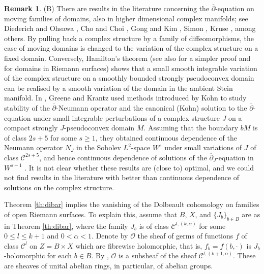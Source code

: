 \documentclass[11pt]{amsart}
\numberwithin{equation}{section}
\theoremstyle{definition}
\newtheorem{remark}[theorem]{Remark}
\newcommand\Cscr{\mathscr{C}}
\newcommand\Oscr{\mathscr{O}}
\newcommand\dibar{\overline\partial}
\begin{document}
\begin{remark}
\noindent 
(B) There are results in the literature concerning the $\dibar$-equation 
on moving families of domains, also in higher dimensional complex manifolds; 
see Diederich and Ohsawa \cite{DiederichOhsawa1991}, 
Cho and Choi \cite{ChoChoi2008}, 
Gong and Kim \cite[Theorem 4.5]{GongKim2018},
Simon \cite{Simon2019JGA}, 
Kruse \cite{Kruse2020}, 
among others. By pulling back a complex structure by a
family of diffeomorphisms, the case of moving domains
is changed to the variation of the complex structure on a fixed domain. 
Conversely, Hamilton's theorem \cite{Hamilton1977} 
(see also \cite[Theorem 1.13]{GreeneKrantz1982} 
for a simpler proof and \cite[Corollary 4.5]{Forstneric2024Runge} for 
domains in Riemann surfaces) shows that a small smooth
integrable variation of the complex structure on a 
smoothly bounded strongly pseudoconvex domain can be realised
by a smooth variation of the domain in the ambient Stein manifold.
In \cite{GreeneKrantz1982}, Greene and Krantz 
used methods introduced by Kohn \cite{Kohn1963,Kohn1964}
to study stability of the $\dibar$-Neumann operator and 
the canonical (Kohn) solution %
to the $\dibar$-equation under small integrable perturbations 
of a complex structure $J$ on a compact strongly 
$J$-pseudoconvex domain $\overline M$.
Assuming that the boundary $bM$ is of class $2s+5$ for some $s\ge 1$,
they obtained continuous dependence of the Neumann operator
$N_J$ in the Sobolev $L^2$-space $W^{s}$ 
under small variations of $J$ of class $\Cscr^{2s+5}$, and hence
continuous dependence of solutions of the $\dibar_J$-equation 
in $W^{s-1}$ \cite[Theorems 3.9, and 3.10]{GreeneKrantz1982}.
It is not clear whether these results are (close to) optimal, 
and we could not find results in the literature with better than continuous 
dependence of solutions on the complex structure.
\end{remark}


%
%

Theorem \ref{th:dibar} implies the vanishing of the 
Dolbeault cohomology on families of open Riemann surfaces. 
To explain this, assume that 
$B$, $X$, and $\{J_b\}_{b\in B}$ are as in Theorem \ref{th:dibar}, 
where the family $J_b$ is of class $\Cscr^{l,(k,\alpha)}$ for some 
$0\le l\le k+1$ and $0<\alpha<1$.  
Denote by $\Oscr$ the sheaf of germs of functions $f$ of class 
$\Cscr^{l}$ on $Z=B\times X$ which are fibrewise holomorphic,
that is, $f_b=f(b,\cdotp)$ is $J_b$-holomorphic for each $b\in B$. 
By \cite[Lemma 5.6]{Forstneric2024Runge},
$\Oscr$ is a subsheaf of the sheaf $\Cscr^{l,(k+1,\alpha)}$.
These are sheaves of unital abelian rings, in particular, of abelian groups. 
\end{document}
